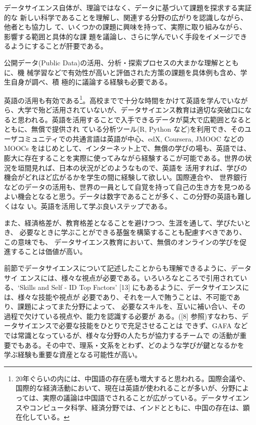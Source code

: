 \documentclass[
]{book}
\theoremstyle{definition}
\theoremstyle{definition}
\theoremstyle{definition}
\theoremstyle{definition}
\theoremstyle{remark}
\begin{document}
データサイエンス自体が、理論ではなく、データに基づいて課題を探求する実証的な 新しい科学であることを理解し、関連する分野の広がりを認識しながら、他者とも協力し て、いくつかの課題に興味を持って、実際に取り組みながら、影響する範囲と具体的な課 題を議論し、さらに学んでいく手段をイメージできるようにすることが肝要である。

公開データ(Public Data)の活用、分析・探索プロセスの大まかな理解とともに、機 械学習などで有効性が高いと評価された方策の課題を具体例も含め、学生自身が調べ、積 極的に議論する経験も必要である。

英語の活用も有効である\footnote{20年ぐらいの内には、中国語の存在感も増大すると思われる。国際会議や、国際的な経済活動において、現在は英語が使われることが多いが、分野によっては、実際の議論は中国語でされることが広がっている。データサイエンスやコンピュータ科学、経済分野では、インドとともに、中国の存在は、顕在化している。}。高校までで十分な時間をかけて英語を学んでいながら、大学で殆ど活用されていないが、データサイエンス教育は適切な突破口になると思われる。英語を活用することで入手できるデータが莫大で広範囲となるとともに、無償で提供され ている分析ツール(R, Python など)を利用でき、そのユーザコミュニティでの共通言語は英語が中心、edX, Coursera, JMOOC などの MOOCs をはじめとして、インターネット上で、無償の学びの場も、英語では、膨大に存在することを実際に使ってみながら経験するこが可能である。世界の状況を垣間見れば、日本の状況がどのようなもので、英語を 活用すれば、学びの機会がどれほど広がるかを学生の間に経験して欲しい。国際連合や、 世界銀行などのデータの活用も、世界の一員として自覚を持って自己の生き方を見つめる よい機会となると思う。データは数字であることが多く、この分野の英語も難しくはな い。英語を活用して学ぶ良いステップである。

また、経済格差が、教育格差となることを避けつつ、生涯を通して、学びたいとき、 必要なときに学ぶことができる基盤を構築することも配慮すべきであり、この意味でも、 データサイエンス教育において、無償のオンラインの学びを促進することは価値が高い。

前節でデータサイエンスについて記述したことからも理解できるように、データサイ エンスには、様々な視点が必要である。いろいろなところで引用されている、`Skills and Self - ID Top Factors' {[}13{]} にもあるように、データサイエンスには、様々な技能や視点が 必要であり、それを一人で賄うことは、不可能であり、課題によってまた分野によって、 必要なスキルを、互いに補い合い、その過程で欠けている視点や、能力を認識する必要が ある。({[}8{]} 参照)すなわち、データサイエンスで必要な技能をひとりで充足させることは できず、GAFA などでは常識となっているが、様々な分野の人たちが協力するチームで の活動が重要でもある。その中で、理系・文系をとわず、どのような学びが鍵となるかを 学ぶ経験も重要な資産となる可能性が高い。
\end{document}
